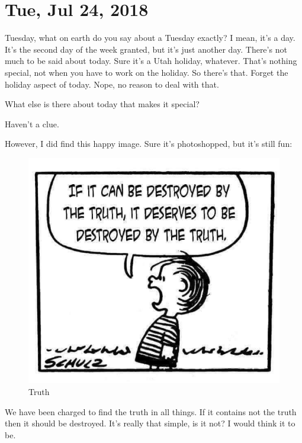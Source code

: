 \section{Tue, Jul 24, 2018}

Tuesday, what on earth do you say about a Tuesday exactly? I mean, it's a day. It's
the second day of the week granted, but it's just another day. There's not much to be
said about today. Sure it's a Utah holiday, whatever. That's nothing special, not
when you have to work on the holiday. So there's that. Forget the holiday aspect of
today. Nope, no reason to deal with that.

What else is there about today that makes it special?

Haven't a clue.

However, I did find this happy image. Sure it's photoshopped, but it's still fun:

\begin{figure}[h!]
  \centering
  \includegraphics[width=0.5\linewidth]{2018/images/truth.jpg}
  \caption{Truth}
  \label{fig:truth}
\end{figure}

We have been charged to find the truth in all things. If it contains not the truth
then it should be destroyed. It's really that simple, is it not? I would think it to
be.